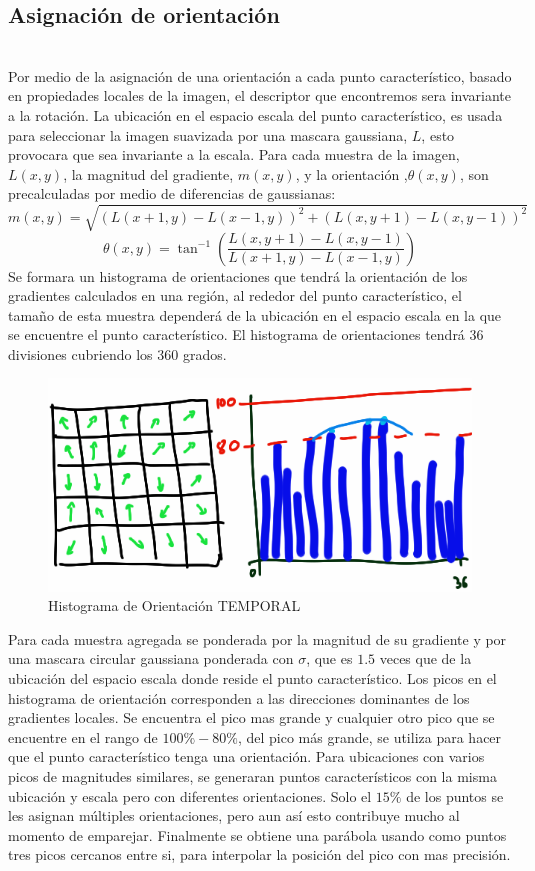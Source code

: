 	\subsection{Asignación de orientación} \hfill \\
		Por medio de la asignación de una orientación a cada punto característico, basado en propiedades locales de la imagen, el descriptor que encontremos sera invariante a la rotación. La ubicación en el espacio escala del punto característico, es usada para seleccionar la imagen suavizada por una mascara gaussiana, $L$, esto provocara que sea invariante a la escala. Para cada muestra de la imagen, $L(x,y)$, la magnitud del gradiente, $m(x,y)$, y la orientación ,$\theta(x,y)$, son precalculadas por medio de diferencias de gaussianas:
  		$$m(x,y) = \sqrt{ (L(x+1,y)-L(x-1,y))^2 + (L(x,y+1)-L(x,y-1))^2 }$$		
		$$\theta(x,y) =  \tan^{-1} \left(\frac{L(x,y+1)-L(x,y-1)}{L(x+1,y)-L(x-1,y)}\right)$$
		Se formara un histograma de orientaciones que tendrá la orientación de los gradientes calculados en una región, al rededor del punto característico, el tamaño de esta muestra dependerá de la ubicación en el espacio escala en la que se encuentre el punto característico. El histograma de orientaciones tendrá 36 divisiones cubriendo los 360 grados.
		\begin{figure}[t]
			\centering
				\includegraphics[scale=0.5]{img/HistoOrientacion.png}
			\caption{Histograma de Orientación TEMPORAL}
		\end{figure}
		Para cada muestra agregada se ponderada por la magnitud de su gradiente y por una mascara circular gaussiana ponderada con $\sigma$, que es $1.5$ veces que de la ubicación del espacio escala donde reside el punto característico.
		Los picos en el histograma de orientación corresponden a las direcciones dominantes de los gradientes locales. Se encuentra el pico mas grande y cualquier otro pico que se encuentre en el rango de $100\% - 80\%$, del pico más grande, se utiliza para hacer que el punto característico tenga una orientación. Para ubicaciones con varios picos de magnitudes similares, se generaran puntos característicos con la misma ubicación y escala pero con diferentes orientaciones. Solo el $15\%$ de los puntos se les asignan múltiples orientaciones, pero aun así esto contribuye mucho al momento de emparejar. Finalmente se obtiene una parábola usando como puntos tres picos cercanos entre si, para interpolar la posición del pico con mas precisión.  
	
